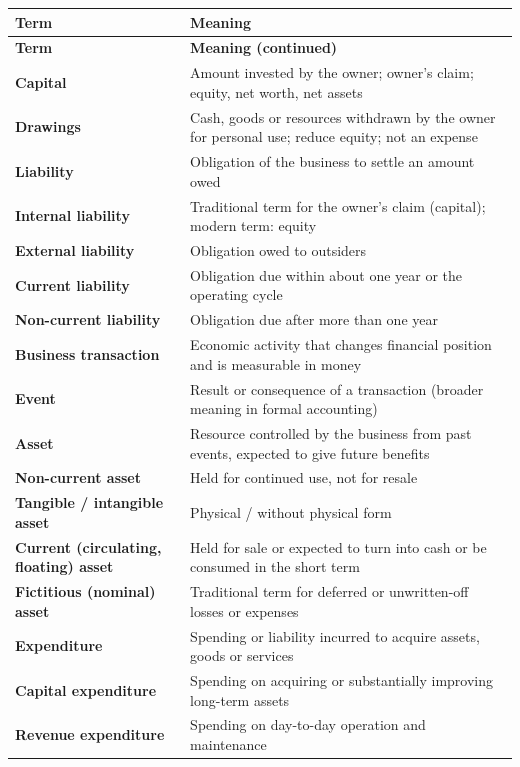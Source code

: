 \documentclass[11pt,a4paper]{article}
\begin{document}
{\footnotesize
\begin{xltabular}{\textwidth}{@{}l Y@{}}
\toprule
{}\textbf{Term} & \textbf{Meaning}\\
\midrule
\endfirsthead
{}\textbf{Term} & \textbf{Meaning (continued)}\\
\midrule
\endhead
\bottomrule
\endfoot
\bottomrule
\endlastfoot
\textbf{Capital} & Amount invested by the owner; owner's claim; equity, net worth, net assets\\
\textbf{Drawings} & Cash, goods or resources withdrawn by the owner for personal use; reduce equity; not an expense\\
\textbf{Liability} & Obligation of the business to settle an amount owed\\
\textbf{Internal liability} & Traditional term for the owner's claim (capital); modern term: equity\\
\textbf{External liability} & Obligation owed to outsiders\\
\textbf{Current liability} & Obligation due within about one year or the operating cycle\\
\textbf{Non-current liability} & Obligation due after more than one year\\
\textbf{Business transaction} & Economic activity that changes financial position and is measurable in money\\
\textbf{Event} & Result or consequence of a transaction (broader meaning in formal accounting)\\
\textbf{Asset} & Resource controlled by the business from past events, expected to give future benefits\\
\textbf{Non-current asset} & Held for continued use, not for resale\\
\textbf{Tangible / intangible asset} & Physical / without physical form\\
\textbf{Current (circulating, floating) asset} & Held for sale or expected to turn into cash or be consumed in the short term\\
\textbf{Fictitious (nominal) asset} & Traditional term for deferred or unwritten-off losses or expenses\\
\textbf{Expenditure} & Spending or liability incurred to acquire assets, goods or services\\
\textbf{Capital expenditure} & Spending on acquiring or substantially improving long-term assets\\
\textbf{Revenue expenditure} & Spending on day-to-day operation and maintenance\\

\end{xltabular}}
\end{document}
